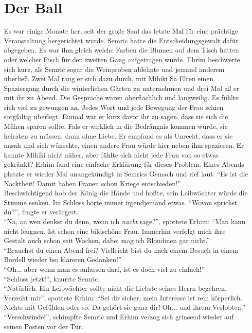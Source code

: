 \chapter{Der Ball}

Es war einige Monate her, seit der große Saal das letzte Mal für eine prächtige Veranstaltung 
hergerichtet wurde. Semric hatte die Entscheidungsgewalt dafür abgegeben. Es war ihm gleich welche 
Farben die Blumen auf dem Tisch hatten oder welcher Fisch für den zweiten Gang aufgetragen wurde. 
Ehrim beschwerte sich kurz, als Semric sogar die Weinproben ablehnte und jemand anderem überließ. 
Zwei Mal rang er sich dazu durch, mit Mihiki Sa Elren einen Spaziergang durch die winterlichen 
Gärten zu unternehmen und drei Mal aß er mit ihr zu Abend. Die Gespräche waren oberflächlich und 
langweilig. Es fühlte sich viel zu gewungen an. Jedes Wort und jede Bewegung der Frau schien 
sorgfältig überlegt. Einmal war er kurz davor ihr zu sagen, dass sie sich die Mühen sparen sollte. 
Fals er wirklich in die Bedrängnis kommen würde, sie heiraten zu müssen, dann ohne Liebe. Er 
empfand es als Unrecht, dass er sie ansah und sich wünschte, einen andere Frau würde hier neben ihm 
spazieren. Er kannte Mihiki nicht näher, aber fühlte sich nicht jede Frau von so etwas gekränkt? 
Erhim fand eine einfache Erklärung für dieses Problem. Eines Abends platzte er wieder Mal 
unangekündigt in Semrics Gemach und rief laut: ``Es ist die Nacktheit! Damit haben Frauen schon 
Kriege entschieden!''\\
Beschwichtigend hob der König die Hände und hoffte, sein Leibwächter würde die Stimme senken. Im 
Schloss hörte immer irgendjemand etwas. ``Wovon sprichst du?'', fragte er verärgert.\\
``Na, an wen denkst du denn, wenn ich \textit{nackt} sage?'', spottete Erhim: ``Man kann nicht 
leugnen. Ist schon eine bildschöne Frau. Immerhin verfolgt mich ihre Gestalt auch schon seit 
Wochen, dabei mag ich Blondinen gar nicht.''\\
``Brauchst du einen Abend frei? Vielleicht bist du nach einem Besuch in einem Bordell wieder bei 
klareren Gedanken!''\\
``Oh... aber wenn man es anfassen darf, ist es doch viel zu einfach!''\\
``Schluss jetzt!'', knurrte Semric.\\
``Natürlich. Ein Leibwächter sollte nicht die Liebste seines Herrn begehren. Verzeiht mir'', 
spottete Erhim: ``Sei dir sicher, mein Interesse ist rein körperlich. Nichts mit Gefühlen oder so. 
Da gehört sie ganz dir! Oh... und ihrem Verlobten.''\\
``Verschwinde!'', schimpfte Semric und Erhim verzog sich grinsend wieder auf seinen Posten vor der 
Tür.\\

